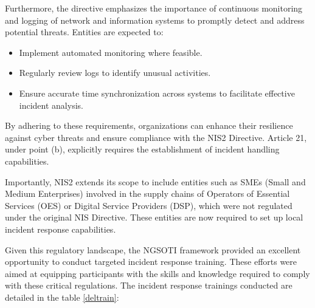Furthermore, the directive emphasizes the importance of continuous monitoring and logging of network and information systems to promptly detect and address potential threats. Entities are expected to:

\begin{itemize}
	\item Implement automated monitoring where feasible.
	\item Regularly review logs to identify unusual activities.
	\item Ensure accurate time synchronization across systems to facilitate effective incident analysis.
\end{itemize}

By adhering to these requirements, organizations can enhance their resilience against cyber threats and ensure compliance with the NIS2 Directive. Article 21, under point (b), explicitly requires the establishment of incident handling capabilities.

Importantly, NIS2 extends its scope to include entities such as SMEs (Small and Medium Enterprises) involved in the supply chains of Operators of Essential Services (OES) or Digital Service Providers (DSP), which were not regulated under the original NIS Directive. These entities are now required to set up local incident response capabilities.

Given this regulatory landscape, the NGSOTI framework provided an excellent opportunity to conduct targeted incident response training. These efforts were aimed at equipping participants with the skills and knowledge required to comply with these critical regulations. The incident response trainings conducted are detailed in the table \ref{deltrain}:


